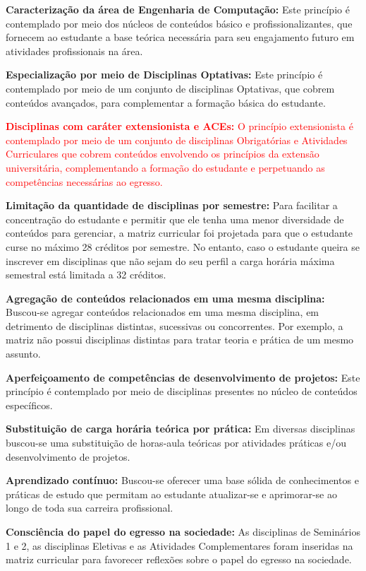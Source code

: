 \begin{itemize}
    \item \textbf{Caracterização da área de Engenharia de Computação:} Este princípio é contemplado por meio dos núcleos de conteúdos básico e profissionalizantes, que fornecem ao estudante a base teórica necessária para seu engajamento futuro em atividades profissionais na área.
    \item \textbf{Especialização por meio de Disciplinas Optativas:} Este princípio é contemplado por meio de um conjunto de disciplinas Optativas, que cobrem conteúdos avançados, para complementar a formação básica do estudante.
    \textcolor{red}{\item \textbf{Disciplinas com caráter extensionista e ACEs:} O princípio extensionista é contemplado por meio de um conjunto de disciplinas Obrigatórias e Atividades Curriculares que cobrem conteúdos envolvendo os princípios da extensão universitária, complementando a formação do estudante e perpetuando as competências necessárias ao egresso.}
    \item \textbf{Limitação da quantidade de disciplinas por semestre:} Para facilitar a concentração do estudante e permitir que ele tenha uma menor diversidade de conteúdos para gerenciar, a matriz curricular foi projetada para que o estudante curse no máximo 28 créditos por semestre. No entanto, caso o estudante queira se inscrever em disciplinas que não sejam do seu perfil a carga horária máxima semestral está limitada a 32 créditos.
    \item \textbf{Agregação de conteúdos relacionados em uma mesma disciplina:} Buscou-se agregar conteúdos relacionados em uma mesma disciplina, em detrimento de disciplinas distintas, sucessivas ou concorrentes. Por exemplo, a matriz não possui disciplinas distintas para tratar teoria e prática de um mesmo assunto.
    \item \textbf{Aperfeiçoamento de competências de desenvolvimento de projetos:} Este princípio é contemplado por meio de disciplinas presentes no núcleo de conteúdos específicos.
    \item \textbf{Substituição de carga horária teórica por prática:} Em diversas disciplinas buscou-se uma substituição de horas-aula teóricas por atividades práticas e/ou desenvolvimento de projetos.
    \item \textbf{Aprendizado contínuo:} Buscou-se oferecer uma base sólida de conhecimentos e práticas de estudo que permitam ao estudante atualizar-se e aprimorar-se ao longo de toda sua carreira profissional.
    \item \textbf{Consciência do papel do egresso na sociedade:} As disciplinas de Seminários 1 e 2, as disciplinas Eletivas e as Atividades Complementares foram inseridas na matriz curricular para favorecer reflexões sobre o papel do egresso na sociedade.
\end{itemize}



